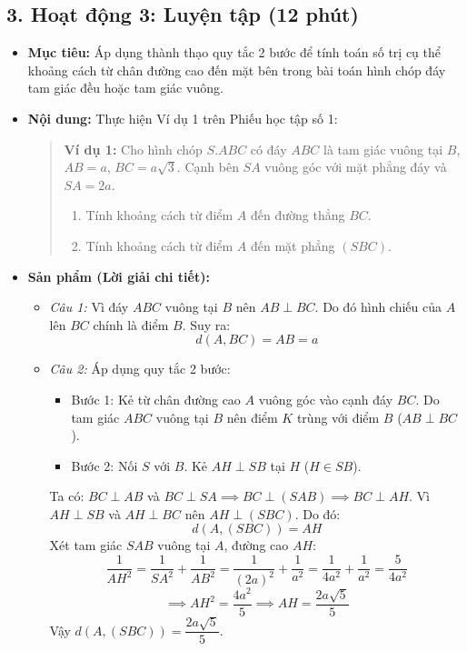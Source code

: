 \documentclass[12pt, a4paper]{article}
\begin{document}
\subsection*{3. Hoạt động 3: Luyện tập (12 phút)}

\begin{itemize}[leftmargin=1.2cm]
    \item[a)] \textbf{Mục tiêu:} Áp dụng thành thạo quy tắc 2 bước để tính toán số trị cụ thể khoảng cách từ chân đường cao đến mặt bên trong bài toán hình chóp đáy tam giác đều hoặc tam giác vuông.
    \item[b)] \textbf{Nội dung:} Thực hiện Ví dụ 1 trên Phiếu học tập số 1:
    \begin{quote}
        \textbf{Ví dụ 1:} Cho hình chóp $S.ABC$ có đáy $ABC$ là tam giác vuông tại $B$, $AB = a$, $BC = a\sqrt{3}$. Cạnh bên $SA$ vuông góc với mặt phẳng đáy và $SA = 2a$.
        \begin{enumerate}
            \item Tính khoảng cách từ điểm $A$ đến đường thẳng $BC$.
            \item Tính khoảng cách từ điểm $A$ đến mặt phẳng $(SBC)$.
        \end{enumerate}
    \end{quote}

    \item[c)] \textbf{Sản phẩm (Lời giải chi tiết):}
    \begin{itemize}[leftmargin=0.6cm]
        \item \textit{Câu 1:} Vì đáy $ABC$ vuông tại $B$ nên $AB \perp BC$. Do đó hình chiếu của $A$ lên $BC$ chính là điểm $B$.
        Suy ra:
        $$d(A, BC) = AB = a$$
        \item \textit{Câu 2:} 
        Áp dụng quy tắc 2 bước:
        \begin{itemize}
            \item Bước 1: Kẻ từ chân đường cao $A$ vuông góc vào cạnh đáy $BC$. Do tam giác $ABC$ vuông tại $B$ nên điểm $K$ trùng với điểm $B$ ($AB \perp BC$).
            \item Bước 2: Nối $S$ với $B$. Kẻ $AH \perp SB$ tại $H$ ($H \in SB$).
        \end{itemize}
        Ta có: $BC \perp AB$ và $BC \perp SA \implies BC \perp (SAB) \implies BC \perp AH$.
        Vì $AH \perp SB$ và $AH \perp BC$ nên $AH \perp (SBC)$.
        Do đó:
        $$d(A, (SBC)) = AH$$
        Xét tam giác $SAB$ vuông tại $A$, đường cao $AH$:
        $$\dfrac{1}{AH^2} = \dfrac{1}{SA^2} + \dfrac{1}{AB^2} = \dfrac{1}{(2a)^2} + \dfrac{1}{a^2} = \dfrac{1}{4a^2} + \dfrac{1}{a^2} = \dfrac{5}{4a^2}$$
        $$\implies AH^2 = \dfrac{4a^2}{5} \implies AH = \dfrac{2a\sqrt{5}}{5}$$
        Vậy $d(A, (SBC)) = \dfrac{2a\sqrt{5}}{5}$.
    \end{itemize}


\end{itemize}
\end{document}
